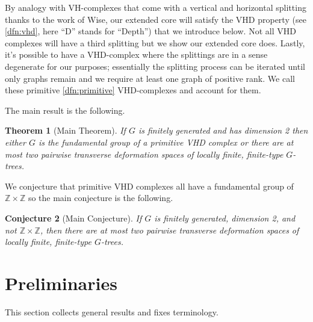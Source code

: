 \documentclass[12pt,parskip=full]{report}
\theoremstyle{plain}
\newtheorem{thm}{Theorem}[section]
\newtheorem{conj}[thm]{Conjecture}
\theoremstyle{definition}
\newtheorem{exa}[thm]{Example}
\begin{document}
By analogy with VH-complexes that come with a vertical and horizontal splitting thanks to the work of Wise, our extended core  will satisfy the VHD property (see \ref{dfn:vhd}, here ``D'' stands for ``Depth'') that we introduce below. Not all VHD complexes will have a third splitting but we show our extended core does. Lastly, it's possible to have a VHD-complex where the splittings are in a sense degenerate for our purposes; essentially the splitting process can be iterated until only graphs remain and we require at least one graph of positive rank. We call these primitive \ref{dfn:primitive} VHD-complexes and account for them.

The main result is the following.
\begin{thm}
    [Main Theorem]
    \label{thm:martino}
    If \(G\) is finitely generated and has dimension 2 then either \(G\) is the fundamental group of a primitive VHD complex or there are at most two pairwise transverse deformation spaces of locally finite, finite-type \(G\)-trees.
\end{thm}

% 

We conjecture that primitive VHD complexes all have a fundamental group of \(\mathbb{Z}\times \mathbb{Z}\) so the main conjecture is the following.

\begin{conj}
    [Main Conjecture]
    If \(G\) is finitely generated, dimension 2, and not \(\mathbb{Z}\times \mathbb{Z}\), then there are at most two pairwise transverse deformation spaces of locally finite, finite-type \(G\)-trees.
\end{conj}

\chapter{Preliminaries}

    This section collects general results and fixes terminology.



\end{document}
